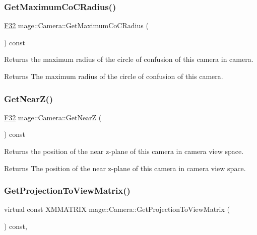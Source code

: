 \subsubsection{\texorpdfstring{Get\+Maximum\+Co\+C\+Radius()}{GetMaximumCoCRadius()}}
{\footnotesize\ttfamily \hyperlink{namespacemage_aa97e833b45f06d60a0a9c4fc22ae02c0}{F32} mage\+::\+Camera\+::\+Get\+Maximum\+Co\+C\+Radius (\begin{DoxyParamCaption}{ }\end{DoxyParamCaption}) const\hspace{0.3cm}{\ttfamily [noexcept]}}

Returns the maximum radius of the circle of confusion of this camera in camera.

\begin{DoxyReturn}{Returns}
The maximum radius of the circle of confusion of this camera. 
\end{DoxyReturn}
\hypertarget{classmage_1_1_camera_add4054d66911dd183cdec85eda77b4a1}{}\label{classmage_1_1_camera_add4054d66911dd183cdec85eda77b4a1} 
\subsubsection{\texorpdfstring{Get\+Near\+Z()}{GetNearZ()}}
{\footnotesize\ttfamily \hyperlink{namespacemage_aa97e833b45f06d60a0a9c4fc22ae02c0}{F32} mage\+::\+Camera\+::\+Get\+NearZ (\begin{DoxyParamCaption}{ }\end{DoxyParamCaption}) const\hspace{0.3cm}{\ttfamily [noexcept]}}

Returns the position of the near z-\/plane of this camera in camera view space.

\begin{DoxyReturn}{Returns}
The position of the near z-\/plane of this camera in camera view space. 
\end{DoxyReturn}
\hypertarget{classmage_1_1_camera_a7a919b85084c79786a65c6df8872f6f1}{}\label{classmage_1_1_camera_a7a919b85084c79786a65c6df8872f6f1} 
\subsubsection{\texorpdfstring{Get\+Projection\+To\+View\+Matrix()}{GetProjectionToViewMatrix()}}
{\footnotesize\ttfamily virtual const X\+M\+M\+A\+T\+R\+IX mage\+::\+Camera\+::\+Get\+Projection\+To\+View\+Matrix (\begin{DoxyParamCaption}{ }\end{DoxyParamCaption}) const\hspace{0.3cm}{\ttfamily [pure virtual]}, {\ttfamily [noexcept]}}

